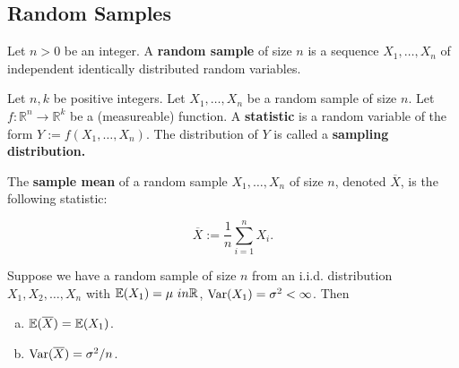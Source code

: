 \subsection{Random Samples}

\begin{definition} Let \(n >0\) be an integer.  A \textbf{random sample} of size \(n\) is a sequence \(X_1, \ldots, X_n\) of independent identically distributed random variables.

\end{definition}

\begin{definition} Let \(n, k\) be positive integers. Let \(X_1, \ldots, X_n\) be a random sample of size \(n\). Let \(f: \mathbb{R}^n \to \mathbb{R}^k\) be a (measureable) function. A \textbf{statistic} is a random variable of the form \(Y:= f(X_1, \ldots, X_n)\). The distribution of \(Y\) is called a \textbf{sampling distribution.}

\end{definition}

\begin{definition} The \textbf{sample mean} of a random sample \(X_1, \ldots, X_n\) of size \(n\), denoted \(\overline{X}\), is the following statistic:

\[
\overline{X} := \frac{1}{n} \sum_{i=1}^n X_i.
\]

\end{definition}

\begin{proposition}\label{mathstats.sample.mean.props} Suppose we have a random sample of size \(n\) from an i.i.d. distribution \(X_1, X_2, \ldots, X_n\) with \(\E(X_1) = \mu \ in \mathbb{R}\), \(\Var(X_1) = \sigma^2 < \infty\). Then

\begin{enumerate}[(a)]

\item \(\E(\overline{X}) = \E(X_1)\).

\item \( \Var(\overline{X}) = \sigma^2/n\).

\end{enumerate}

\end{proposition}

